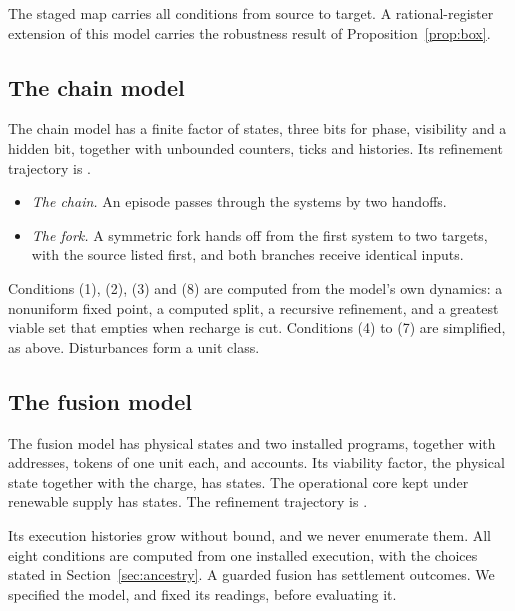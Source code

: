 The staged map carries all \snapPosZeroFourStagedClauseCount{} conditions from
source to target. A rational-register extension of this model carries the
robustness result of Proposition~\ref{prop:box}.

\subsection{The chain model}
\label{app:chain}

The chain model has a finite factor of \snapGSevenNativeFactorStates{} states,
three bits for phase, visibility and a hidden bit, together with unbounded
counters, ticks and histories. Its refinement trajectory is
\snapGSevenCThreeTrajectory{}.
\begin{itemize}
\item \emph{The chain.} An episode passes through the systems
\snapGSevenStrictChainSystemIds{} by two handoffs.
\item \emph{The fork.} A symmetric fork hands off from the first system to
two targets, \snapGSevenForkSystemIds{} with the source listed first, and both
branches receive identical inputs.
\end{itemize}
Conditions (1), (2), (3) and (8) are computed from the model's own dynamics:
a nonuniform fixed point, a computed split, a recursive refinement, and a
greatest viable set that empties when recharge is cut. Conditions (4) to (7) are
simplified, as above. Disturbances form a unit class.

\subsection{The fusion model}
\label{app:fusion}

The fusion model has \snapFullNativeZeroTwoPhysicalStates{} physical states and
two installed programs, together with addresses, tokens of one unit each, and
accounts. Its viability factor, the physical state together with the charge,
has \snapFullNativeZeroTwoCEightFactorStates{} states. The operational core
kept under renewable supply has \snapFullNativeZeroTwoOperationalCoreStates{}
states. The refinement trajectory is \snapFullNativeZeroTwoCThreeTrajectory{}.

Its execution histories grow without bound, and we never enumerate them. All eight conditions are computed
from one installed execution, with the choices stated in
Section~\ref{sec:ancestry}. A guarded fusion has
\snapFullNativeZeroTwoFusionOutcomeCount{} settlement outcomes. We specified the model, and fixed its readings, before evaluating it.

